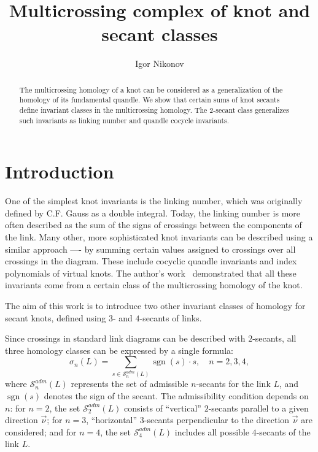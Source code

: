 \documentclass{article}
\title{Multicrossing complex of knot and secant classes}
\author{Igor Nikonov}
\date{}
\theoremstyle{definition}
\theoremstyle{remark}
\DeclareMathOperator{\sgn}{\mathrm{sgn}}
\begin{document}
\maketitle

\begin{abstract}
    The multicrossing homology of a knot can be considered as a generalization of the homology of its fundamental quandle. We show that certain sums of knot secants define invariant classes in the multicrossing homology. The 2-secant class generalizes such invariants as linking number and quandle cocycle invariants.
\end{abstract}

\section{Introduction}

One of the simplest knot invariants is the linking number, which was originally defined by C.F. Gauss as a double integral. Today, the linking number is more often described as the sum of the signs of crossings between the components of the link. Many other, more sophisticated knot invariants can be described using a similar approach —- by summing certain values assigned to crossings over all crossings in the diagram. These include cocyclic quandle invariants and index polynomials of virtual knots. The author's work~\cite{Nca} demonstrated that all these invariants come from a certain class of the multicrossing homology of the knot.

The aim of this work is to introduce two other invariant classes of homology for secant knots, defined using $3$- and $4$-secants of links.

Since crossings in standard link diagrams can be described with $2$-secants, all three homology classes can be expressed by a single formula:
\begin{equation}\label{eq:secant_class}
\sigma_n(L)=\sum_{s\in\mathcal S^{adm}_n(L)}\sgn(s)\cdot s,\quad n=2,3,4,
\end{equation}
where $\mathcal S^{adm}_n(L)$ represents the set of admissible $n$-secants for the link $L$, and $\sgn(s)$ denotes the sign of the secant. The admissibility condition depends on $n$: for $n=2$, the set $\mathcal S^{adm}_2(L)$ consists of ``vertical'' $2$-secants parallel to a given direction $\vec\nu$; for $n=3$, ``horizontal'' $3$-secants perpendicular to the direction $\vec\nu$ are considered; and for $n=4$, the set $\mathcal S^{adm}_4(L)$ includes all possible $4$-secants of the link $L$.
\end{document}
